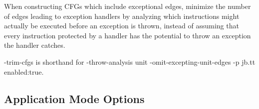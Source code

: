 \documentclass{article}
\begin{document}
\begin{description}
\par

When constructing CFGs which include exceptional edges, minimize
the number of edges leading to exception handlers by analyzing
which instructions might actually be executed before an exception
is thrown, instead of assuming that every instruction protected
by a handler has the potential to throw an exception the handler
catches.


\par

-trim-cfgs is shorthand for -throw-analysis
unit -omit-excepting-unit-edges -p jb.tt enabled:true.



\end{description}


\subsection{Application Mode Options}
\end{document}
